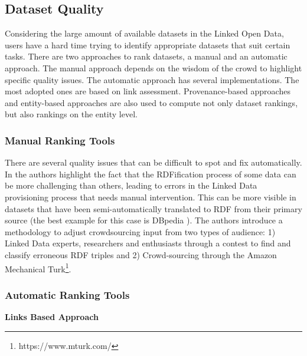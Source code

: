 \documentclass[onecolumn, crcready]{iosart2c}
\begin{document}
\subsection {Dataset Quality}
Considering the large amount of available datasets in the Linked Open Data, users have a hard time trying to identify appropriate datasets that suit certain tasks. There are two approaches to rank datasets, a manual and an automatic approach. The manual approach depends on the wisdom of the crowd to highlight specific quality issues. The automatic approach has several implementations. The most adopted ones are based on link assessment. Provenance-based approaches and entity-based approaches are also used to compute not only dataset rankings, but also rankings on the entity level.\\


\subsubsection {Manual Ranking Tools}

There are several quality issues that can be difficult to spot and fix automatically. In \cite{Acosta2013} the authors highlight the fact that the RDFification process of some data can be more challenging than others, leading to errors in the Linked Data provisioning process that needs manual intervention. This can be more visible in datasets that have been semi-automatically translated to RDF from their primary source (the best example for this case is DBpedia \cite{bizer_dbpedia_2009}). The authors introduce a methodology to adjust crowdsourcing input from two types of audience: 1) Linked Data experts, researchers and enthusiasts through a contest to find and classify erroneous RDF triples and 2) Crowd-sourcing through the Amazon Mechanical Turk\footnote{https://www.mturk.com/}.\\

\subsubsection {Automatic Ranking Tools}

{\bf Links Based Approach}\\
\end{document}
